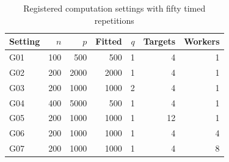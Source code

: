 \begin{table}

\caption{\label{tab:registered-computation-design}Registered computation settings with fifty timed repetitions}
\centering
\begin{tabular}[t]{lrrrrrr}
\toprule
Setting & $n$ & $p$ & Fitted & $q$ & Targets & Workers\\
\midrule
G01 & 100 & 500 & 500 & 1 & 4 & 1\\
G02 & 200 & 2000 & 2000 & 1 & 4 & 1\\
G03 & 200 & 1000 & 1000 & 2 & 4 & 1\\
G04 & 400 & 5000 & 500 & 1 & 4 & 1\\
G05 & 200 & 1000 & 1000 & 1 & 12 & 1\\
G06 & 200 & 1000 & 1000 & 1 & 4 & 4\\
G07 & 200 & 1000 & 1000 & 1 & 4 & 8\\
\bottomrule
\end{tabular}
\end{table}

